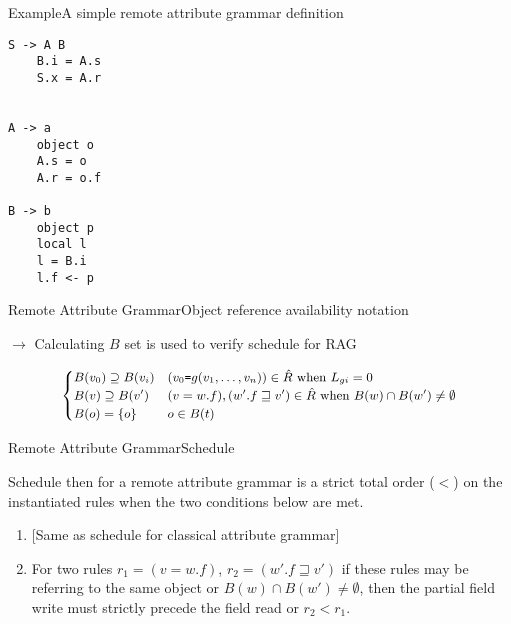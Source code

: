 \begin{frame}[fragile=singleslide]{Example}{A simple remote attribute grammar definition}


\begin{multicols}{3}
\begin{Verbatim}[fontsize=\small]
S -> A B
    B.i = A.s
    S.x = A.r


A -> a
    object o
    A.s = o
    A.r = o.f

B -> b
    object p
    local l
    l = B.i
    l.f <- p
\end{Verbatim}
\end{multicols}
    
\end{frame}


\begin{frame}{Remote Attribute Grammar}{Object reference availability notation}

$\to$ Calculating $B$ set is used to \alert{verify schedule for RAG} \cite{Boyland05remoteattribute}

\newlinevspace

\begin{equation}
\small
  \begin{gathered}
\begin{cases}
B(v_0) \supseteq B(v_i)    & (v_0 \texttt{=} g(v_1, \dots, v_n )) \in \hat R \text{ when } L_{g i} = 0 \\
B(v) \supseteq B(v') &  (v = w. f ), (w'.f \sqsupseteq v') \in \hat R \text{ when } B(w) \cap B(w') \neq \emptyset \\
B(o) = \{o\} & o \in B(t) \\
\end{cases}
  \end{gathered}
\end{equation}

\end{frame}

\begin{frame}{Remote Attribute Grammar}{Schedule}

\begin{definition}
Schedule then for a remote attribute grammar is a strict total order ($<$) on the instantiated rules when the two conditions below are met.
 
\begin{minipage}[t]{\linegoal}
\begin{enumerate}

\item {[Same as schedule for classical attribute grammar]}

\item For two rules $r_1 = (v = w.f)$, $r_2 = (w'.f \sqsupseteq v')$ if these rules may be referring to the same object or $B(w) \cap B(w') \neq \emptyset$, then the partial field write must strictly precede the field read or $r_2 < r_1$.
\end{enumerate}
\end{minipage}
\end{definition}
    
\end{frame}



